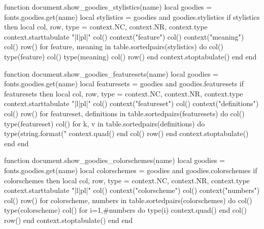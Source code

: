 
\startluacode

    function document.show_goodies_stylistics(name)
        local goodies = fonts.goodies.get(name)
        local stylistics = goodies and goodies.stylistics
        if stylistics then
            local col, row, type = context.NC, context.NR, context.type
            context.starttabulate { "|l|pl|" }
            col() context("feature") col() context("meaning") col() row()
            for feature, meaning in table.sortedpairs(stylistics) do
                col() type(feature) col() type(meaning) col() row()
            end
            context.stoptabulate()
        end
    end

    function document.show_goodies_featuresets(name)
        local goodies = fonts.goodies.get(name)
        local featuresets = goodies and goodies.featuresets
        if featuresets then
            local col, row, type = context.NC, context.NR, context.type
            context.starttabulate { "|l|pl|" }
            col() context("featureset") col() context("definitions") col() row()
            for featureset, definitions in table.sortedpairs(featuresets) do
            col() type(featureset) col()
            for k, v in table.sortedpairs(definitions) do
                type(string.format("%
                context.quad()
            end
            col() row()
            end
            context.stoptabulate()
        end
    end

    function document.show_goodies_colorschemes(name)
        local goodies = fonts.goodies.get(name)
        local colorschemes = goodies and goodies.colorschemes
        if colorschemes then
            local col, row, type = context.NC, context.NR, context.type
            context.starttabulate { "|l|pl|" }
            col() context("colorscheme") col() context("numbers") col() row()
            for colorscheme, numbers in table.sortedpairs(colorschemes) do
                col() type(colorscheme) col()
                for i=1,#numbers do
                    type(i)
                    context.quad()
                end
                col() row()
            end
            context.stoptabulate()
        end
    end

\stopluacode

\def\showgoodiesstylistics  #1{\ctxlua{document.show_goodies_stylistics  ("#1")}}
\def\showgoodiesfeaturesets #1{\ctxlua{document.show_goodies_featuresets ("#1")}}
\def\showgoodiescolorschemes#1{\ctxlua{document.show_goodies_colorschemes("#1")}}

\endinput
